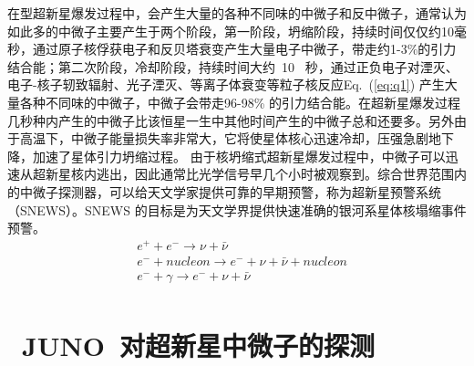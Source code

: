 在\uppercase\expandafter{}型超新星爆发过程中，会产生大量的各种不同味的中微子和反中微子，通常认为如此多的中微子主要产生于两个阶段，第一阶段，坍缩阶段，持续时间仅仅约10毫秒，通过原子核俘获电子和反贝塔衰变产生大量电子中微子，带走约1-3\%的引力结合能；第二次阶段，冷却阶段，持续时间大约~10~ 秒，通过正负电子对湮灭、电子-核子轫致辐射、光子湮灭、等离子体衰变等粒子核反应Eq.~(\ref{eq:q1}) 产生大量各种不同味的中微子，中微子会带走96-98\% 的引力结合能。在超新星爆发过程几秒种内产生的中微子比该恒星一生中其他时间产生的中微子总和还要多。另外由于高温下，中微子能量损失率非常大，它将使星体核心迅速冷却，压强急剧地下降，加速了星体引力坍缩过程。
由于核坍缩式超新星爆发过程中，中微子可以迅速从超新星核内逃出，因此通常比光学信号早几个小时被观察到。综合世界范围内的中微子探测器，可以给天文学家提供可靠的早期预警，称为超新星预警系统（SNEWS）。SNEWS 的目标是为天文学界提供快速准确的银河系星体核塌缩事件预警。
\begin{equation}\label{eq:q1}
\begin{split}
 & e^{+}+e^{-} \rightarrow \nu+\bar{\nu} \\
 & e^{-}+nucleon \rightarrow e^{-}+\nu+\bar{\nu} +nucleon\\
 & e^{-}+\gamma \rightarrow  e^{-}+\nu+\bar{\nu} \\
\end{split}
\end{equation}
\section{~JUNO~对超新星中微子的探测}
